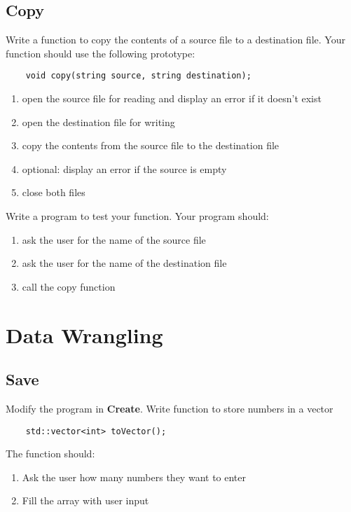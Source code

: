 \documentclass{article}
\begin{document}
\subsection{Copy}
Write a function to copy the contents of a source file to a destination file. Your function should use the following prototype:
\begin{verbatim}
	void copy(string source, string destination);
\end{verbatim}
\begin{enumerate}
	\item open the source file for reading and display an error if it doesn't exist
	\item open the destination file for writing
	\item copy the contents from the source file to the destination file
	\item optional: display an error if the source is empty
	\item close both files
\end{enumerate}
Write a program to test your function. Your program should:
\begin{enumerate}
	\item ask the user for the name of the source file 
	\item ask the user for the name of the destination file
	\item call the copy function
\end{enumerate}

\section{Data Wrangling}
\subsection{Save}
Modify the program in \textbf{Create}. Write function to store numbers in a vector
\begin{verbatim}
	std::vector<int> toVector();
\end{verbatim}
The function should:
\begin{enumerate}
	\item Ask the user how many numbers they want to enter
	\item Fill the array with user input
\end{enumerate}
\end{document}
